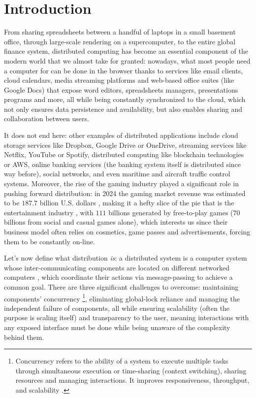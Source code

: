 \section{Introduction}

From sharing spreadsheets between a handful of laptops in a small basement office, through large-scale rendering on a supercomputer, to the entire global finance system, distributed computing has become an essential component of the modern world that we almost take for granted: nowadays, what most people need a computer for can be done in the browser thanks to services like email clients, cloud calendars, media streaming platforms and web-based office suites (like Google Docs) that expose word editors, spreadsheets managers, presentations programs and more, all while being constantly synchronized to the cloud, which not only ensures data persistence and availability, but also enables sharing and collaboration between users. 

It does not end here: other examples of distributed applications include cloud storage services like Dropbox, Google Drive or OneDrive, streaming services like Netflix, YouTube or Spotify, distributed computing like blockchain technologies or AWS, online banking services (the banking system itself is distributed since way before), social networks, and even maritime and aircraft traffic control systems.
Moreover, the rise of the gaming industry played a significant role in pushing forward distribution: in 2024 the gaming market revenue was estimated to be $187.7$ billion U.S. dollars \cite{newzoo}, making it a hefty slice of the pie that is the entertainment industry \cite{pwc}, with $111$ billions generated by free-to-play games \cite{f2prevenue} ($70$ billions from social and casual games alone\cite{casualgames}), which interests us since their business model often relies on cosmetics, game passes and advertisements, forcing them to be constantly on-line. 


Let's now define what distribution \textit{is}: a distributed system is a computer system whose inter-communicating components are located on different networked computers \cite{tanenbaum2017distributed} \cite{Apt2009}, which coordinate their actions via message-passing to achieve a common goal. There are three significant challenges to overcome: maintaining components' concurrency \footnote{Concurrency refers to the ability of a system to execute multiple tasks through simultaneous execution or time-sharing (context switching), sharing resources and managing interactions. It improves responsiveness, throughput, and scalability \cite{OSconcepts} \cite{computerOrganization} \cite{george_coulouris_distributed_2012} \cite{parallelComputing} \cite{parallelDistributedHandbook}.}, eliminating global-lock reliance and managing the independent failure of components, all while ensuring scalability (often the purpose is scaling itself) and transparency to the user, meaning interactions with any exposed interface must be done while being unaware of the complexity behind them.

